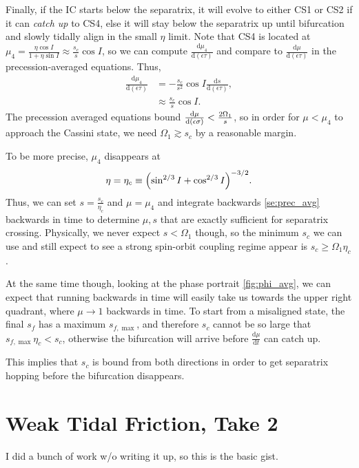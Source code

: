 \documentclass[11pt,
        usenames, %
        dvipsnames %
    ]{article}
\newcommand*{\rd}[2]{\frac{\mathrm{d}#1}{\mathrm{d}#2}}
\DeclarePairedDelimiter\p{\lparen}{\rparen}
\begin{document}
Finally, if the IC starts below the separatrix, it will evolve to either CS1 or
CS2 if it can \emph{catch up} to CS4, else it will stay below the separatrix up
until bifurcation and slowly tidally align in the small $\eta$ limit. Note that
CS4 is located at $\mu_4 = \frac{\eta \cos I}{1 + \eta \sin I} \approx
\frac{s_c}{s}\cos I$, so we can compute $\rd{\mu_4}{(\epsilon\tau)}$ and compare
to $\rd{\mu}{(\epsilon\tau)}$ in the precession-averaged equations. Thus,
\begin{align*}
    \rd{\mu_4}{(\epsilon \tau)} &= -\frac{s_c}{s^2}\cos I
            \rd{s}{(\epsilon\tau)},\\
        &\approx \frac{s_c}{s}\cos I.
\end{align*}
The precession averaged equations bound $\rd{\mu}{\p*{\epsilon\sigma}} <
\frac{2\Omega_1}{s}$, so in order for $\mu < \mu_4$ to approach the Cassini
state, we need $\Omega_1 \gtrsim s_c$ by a reasonable margin.

To be more precise, $\mu_4$ disappears at
\begin{equation}
    \eta = \eta_c \equiv \p*{\sin^{2/3}I + \cos^{2/3}I}^{-3/2}.
\end{equation}
Thus, we can set $s = \frac{s_c}{\eta_c}$ and $\mu = \mu_4$ and integrate
backwards \autoref{se:prec_avg} backwards in time to determine $\mu, s$ that are
exactly sufficient for separatrix crossing. Physically, we never expect $s <
\Omega_1$ though, so the minimum $s_c$ we can use and still expect to see a
strong spin-orbit coupling regime appear is $s_c \geq \Omega_1 \eta_c$.

At the same time though, looking at the phase portrait \autoref{fig:phi_avg}, we
can expect that running backwards in time will easily take us towards the upper
right quadrant, where $\mu \to 1$ backwards in time. To start from a misaligned
state, the final $s_f$ has a maximum $s_{f, \max}$, and therefore $s_c$ cannot
be so large that $s_{f, \max} \eta_c < s_c$, otherwise the bifurcation will
arrive before $\rd{\mu}{t}$ can catch up.

This implies that $s_c$ is bound from both directions in order to get separatrix
hopping before the bifurcation disappears.

\section{Weak Tidal Friction, Take 2}

I did a bunch of work w/o writing it up, so this is the basic gist.
\end{document}
